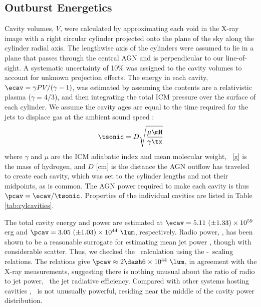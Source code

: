 \documentclass[useAMS,usenatbib]{mn2e}
\begin{document}
\subsection{Outburst Energetics}

Cavity volumes, $V$, were calculated by approximating each void in the
X-ray image with a right circular cylinder projected onto the plane of
the sky along the cylinder radial axis. The lengthwise axis of the
cylinders were assumed to lie in a plane that passes through the
central AGN and is perpendicular to our line-of-sight. A systematic
uncertainty of 10\% was assigned to the cavity volumes to account for
unknown projection effects. The energy in each cavity, $\ecav = \gamma
PV/(\gamma-1)$, was estimated by assuming the contents are a
relativistic plasma ($\gamma = 4/3$), and then integrating the total
ICM pressure over the surface of each cylinder. We assume the cavity
ages are equal to the time required for the jets to displace gas at
the ambient sound speed \citep{birzan04}:
\begin{equation}
  \tsonic = D\sqrt\frac{\mu \mH}{\gamma \tx}
\end{equation}
where $\gamma$ and $\mu$ are the ICM adiabatic index and mean
molecular weight, \mH\ [g] is the mass of hydrogen, and $D$ [cm] is
the distance the AGN outflow has traveled to create each cavity, which
was set to the cylinder lengths and not their midpoints, as is
common. The AGN power required to make each cavity is thus $\pcav =
\ecav/\tsonic$. Properties of the individual cavities are listed in
Table \ref{tab:cylcavities}.

The total cavity energy and power are estimated at $\ecav = 5.11 ~(\pm
1.33) \times 10^{59}$ erg and $\pcav = 3.05 ~(\pm 1.03) \times 10^{44}
~\lum$, respectively. Radio power, \prad, has been shown to be a
reasonable surrogate for estimating mean jet power \citep{birzan08},
though with considerable scatter. Thus, we checked the
\pcav\ calculation using the \citet{pjet} \pcav-\prad\ scaling
relations. The relations give $\pcav \approx 2 \dash 6 \times 10^{44}
~\lum$, in agreement with the X-ray measurements, suggesting there is
nothing unusual about the ratio of radio to jet power, \ie\ the jet
radiative efficiency. Compared with other systems hosting cavities
\citep[\eg][]{birzan04, dunn08}, \irs\ is not unusually powerful,
residing near the middle of the cavity power distribution.
\end{document}
